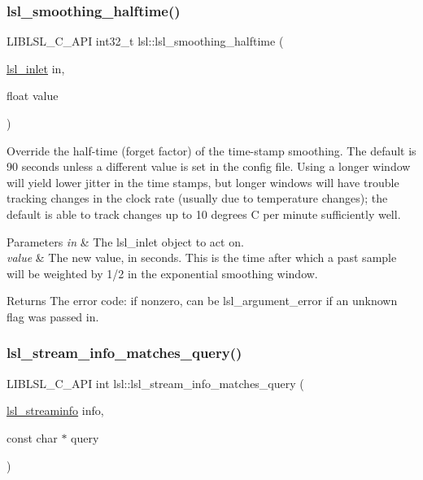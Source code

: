 \subsubsection{\texorpdfstring{lsl\+\_\+smoothing\+\_\+halftime()}{lsl\_smoothing\_halftime()}}
{\footnotesize\ttfamily L\+I\+B\+L\+S\+L\+\_\+\+C\+\_\+\+A\+PI int32\+\_\+t lsl\+::lsl\+\_\+smoothing\+\_\+halftime (\begin{DoxyParamCaption}\item[{\hyperlink{namespacelsl_a884a3363cfcba75d7ce8f00c1c4c54f1}{lsl\+\_\+inlet}}]{in,  }\item[{float}]{value }\end{DoxyParamCaption})}

Override the half-\/time (forget factor) of the time-\/stamp smoothing. The default is 90 seconds unless a different value is set in the config file. Using a longer window will yield lower jitter in the time stamps, but longer windows will have trouble tracking changes in the clock rate (usually due to temperature changes); the default is able to track changes up to 10 degrees C per minute sufficiently well. 
\begin{DoxyParams}{Parameters}
{\em in} & The lsl\+\_\+inlet object to act on. \\
\hline
{\em value} & The new value, in seconds. This is the time after which a past sample will be weighted by 1/2 in the exponential smoothing window. \\
\hline
\end{DoxyParams}
\begin{DoxyReturn}{Returns}
The error code\+: if nonzero, can be lsl\+\_\+argument\+\_\+error if an unknown flag was passed in. 
\end{DoxyReturn}
\mbox{\label{namespacelsl_a5c10ba1783b34bd0b3f048ac4cb5fe5e}} 
\subsubsection{\texorpdfstring{lsl\+\_\+stream\+\_\+info\+\_\+matches\+\_\+query()}{lsl\_stream\_info\_matches\_query()}}
{\footnotesize\ttfamily L\+I\+B\+L\+S\+L\+\_\+\+C\+\_\+\+A\+PI int lsl\+::lsl\+\_\+stream\+\_\+info\+\_\+matches\+\_\+query (\begin{DoxyParamCaption}\item[{\hyperlink{namespacelsl_aa0a9ce9956061679949daa2e35aae2e8}{lsl\+\_\+streaminfo}}]{info,  }\item[{const char $\ast$}]{query }\end{DoxyParamCaption})}

